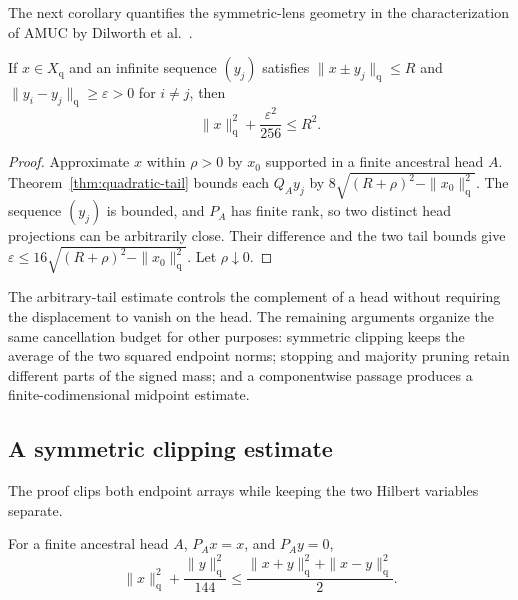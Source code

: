 The next corollary quantifies the symmetric-lens geometry in the
characterization of AMUC by Dilworth et al.~\cite[Theorem~2.1]{DKRRZ2016}.

\begin{corollary}\label{qp:lens-eight}
If $x\in X_{\mathrm q}$ and an infinite sequence $(y_j)$ satisfies
$\|x\pm y_j\|_{\mathrm q}\le R$ and
$\|y_i-y_j\|_{\mathrm q}\ge\varepsilon>0$ for $i\ne j$, then
\[
 \|x\|_{\mathrm q}^2+\frac{\varepsilon^2}{256}\le R^2.
\]
\end{corollary}

\begin{proof}
Approximate $x$ within $\rho>0$ by $x_0$ supported in a finite
ancestral head $A$.  Theorem~\ref{thm:quadratic-tail} bounds each
$Q_Ay_j$ by $8\sqrt{(R+\rho)^2-\|x_0\|_{\mathrm q}^2}$.
The sequence $(y_j)$ is bounded, and $P_A$ has finite rank, so two
distinct head projections can be arbitrarily close.  Their difference
and the two tail bounds give
$\varepsilon\le16\sqrt{(R+\rho)^2-\|x_0\|_{\mathrm q}^2}$.
Let $\rho\downarrow0$.
\end{proof}

The arbitrary-tail estimate controls the complement of a head without
requiring the displacement to vanish on the head. The remaining arguments
organize the same cancellation budget for other purposes: symmetric
clipping keeps the average of the two squared endpoint norms; stopping
and majority pruning retain different parts of the signed mass; and a
componentwise passage produces a finite-codimensional midpoint estimate.

\subsection{A symmetric clipping estimate}

The proof clips both endpoint arrays while keeping the two Hilbert
variables separate.

\begin{proposition}\label{qp:symmetric-twelve}
For a finite ancestral head $A$, $P_Ax=x$, and $P_Ay=0$,
\begin{equation}\label{qp:symmetric-144}
 \|x\|_{\mathrm q}^2+\frac{\|y\|_{\mathrm q}^2}{144}
 \le\frac{\|x+y\|_{\mathrm q}^2+\|x-y\|_{\mathrm q}^2}{2}.
\end{equation}
\end{proposition}

